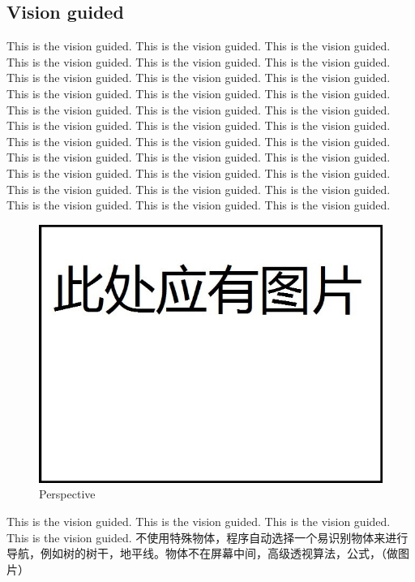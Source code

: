 \documentclass[12pt]{article}
\begin{document}
\begin{flushleft}
\subsection{Vision guided}
This is the vision guided. This is the vision guided. This is the vision guided. This is the vision guided. This is the vision guided. This is the vision guided. This is the vision guided. This is the vision guided. This is the vision guided. This is the vision guided. This is the vision guided. This is the vision guided. This is the vision guided. This is the vision guided. This is the vision guided. This is the vision guided. This is the vision guided. This is the vision guided. This is the vision guided. This is the vision guided. This is the vision guided. This is the vision guided. This is the vision guided. This is the vision guided. This is the vision guided. This is the vision guided. This is the vision guided. This is the vision guided. This is the vision guided. This is the vision guided. This is the vision guided. This is the vision guided. This is the vision guided. 
\begin{figure}[h!]
	\begin{center}
		\includegraphics[scale = 0.6]{perspective.jpg}
		\caption{Perspective}
	\end{center}
\end{figure}
This is the vision guided. This is the vision guided. This is the vision guided. This is the vision guided. 
不使用特殊物体，程序自动选择一个易识别物体来进行导航，例如树的树干，地平线。物体不在屏幕中间，高级透视算法，公式，（做图片）


\end{flushleft}
\end{document}
